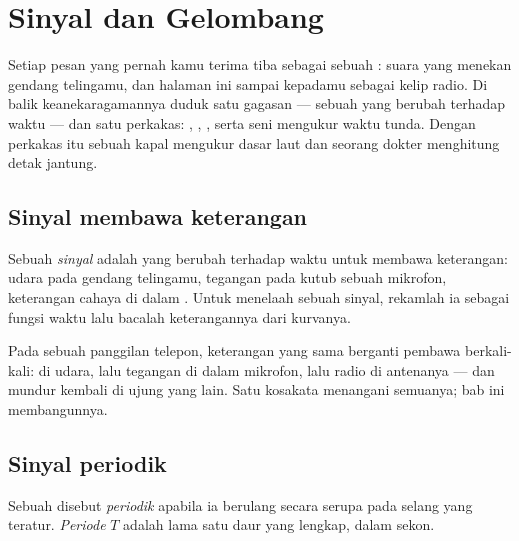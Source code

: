 \chapter{Sinyal dan Gelombang}\label{ch:g10:signals-and-waves}

Setiap pesan yang pernah kamu terima tiba sebagai sebuah : suara
yang menekan gendang telingamu, dan halaman ini sampai kepadamu sebagai
kelip  radio. Di balik keanekaragamannya duduk satu gagasan ---
sebuah  yang berubah terhadap waktu --- dan satu perkakas:
, , , serta seni mengukur waktu tunda. Dengan
perkakas itu sebuah kapal mengukur dasar laut dan seorang dokter
menghitung detak jantung.

\section{Sinyal membawa keterangan}

\begin{definition}[Sinyal]\label{def:g10:signals-and-waves:signal}
Sebuah \emph{sinyal} adalah  yang berubah
terhadap waktu untuk membawa keterangan:  udara pada gendang
telingamu, tegangan pada kutub sebuah mikrofon, keterangan cahaya di
dalam . Untuk menelaah sebuah sinyal, rekamlah ia sebagai
fungsi waktu lalu bacalah keterangannya dari kurvanya.
\end{definition}

Pada sebuah panggilan telepon, keterangan yang sama berganti pembawa
berkali-kali:  di udara, lalu tegangan di dalam mikrofon, lalu
 radio di antenanya --- dan mundur kembali di ujung yang lain.
Satu kosakata menangani semuanya; bab ini membangunnya.

\section{Sinyal periodik}

\begin{definition}\label{def:g10:signals-and-waves:period}
Sebuah  disebut \emph{periodik} apabila ia
berulang secara serupa pada selang yang teratur.
\emph{Periode} $T$ adalah lama satu daur yang lengkap,
dalam sekon.
\end{definition}

